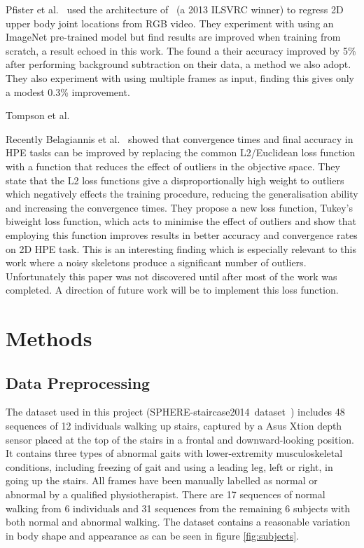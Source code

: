\documentclass[11pt]{article} %
\begin{document}
Pfister et al.~\cite{Pfister} used the architecture of~\cite{Sermanet2013a} (a 2013 ILSVRC winner) to regress 2D upper body joint locations from RGB video. They experiment with using an ImageNet pre-trained model but find results are improved when training from scratch, a result echoed in this work. The found a their accuracy improved by 5\% after performing background subtraction on their data, a method we also adopt. They also experiment with using multiple frames as input, finding this gives only a modest 0.3\% improvement. 

Tompson et al.~\cite{Tompson2014}

Recently Belagiannis et al.~\cite{Belagiannis} showed that convergence times and final accuracy in HPE tasks can be improved by replacing the common L2/Euclidean loss function with a function that reduces the effect of outliers in the objective space. They state that the L2 loss functions give a disproportionally high weight to outliers which negatively effects the training procedure, reducing the generalisation ability and increasing the convergence times. They propose a new loss function, Tukey's biweight loss function, which acts to minimise the effect of outliers and show that employing this function improves results in better accuracy and convergence rates on 2D HPE task. This is an interesting finding which is especially relevant to this work where a noisy skeletons produce a significant number of outliers. Unfortunately this paper was not discovered until after most of the work was completed. A direction of future work will be to implement this loss function.






\section{Methods}

\subsection{Data Preprocessing}
\label{sec:preprocessing}

The dataset used in this project (SPHERE-staircase2014~dataset~\cite{Paiement}) includes 48 sequences of 12 individuals walking up stairs, captured by a Asus Xtion depth sensor placed at the top of the stairs in a frontal and downward-looking position. It contains three types of abnormal gaits with lower-extremity musculoskeletal conditions, including freezing of gait and using a leading leg, left or right, in going up the stairs. All frames have been manually labelled as normal or abnormal by a qualified physiotherapist. There are 17 sequences of normal walking from 6 individuals and 31 sequences from the remaining 6 subjects with both normal and abnormal walking. The dataset contains a reasonable variation in body shape and appearance as can be seen in figure \ref{fig:subjects}.
\end{document}
